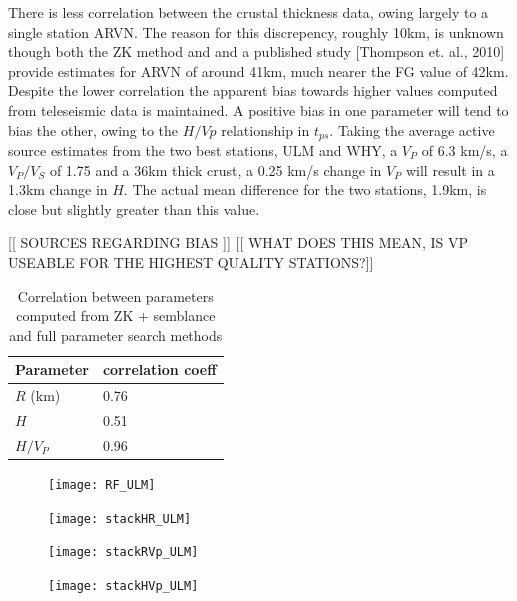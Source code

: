 \documentclass[draft, 12pt]{article}
\begin{document}
There is less correlation between the crustal thickness data, owing largely to a single station ARVN. The reason for this discrepency, roughly 10km, is unknown though both the ZK method and and a published study [Thompson et. al., 2010] provide estimates for ARVN of around 41km, much nearer the FG value of 42km. Despite the lower correlation the apparent bias towards higher values computed from teleseismic data is maintained. A positive bias in one parameter will tend to bias the other, owing to the $H/Vp$ relationship in $t_{ps}$. Taking the average active source estimates from the two best stations, ULM and WHY, a $V_P$ of 6.3 km/s, a $V_P/V_S$ of 1.75 and a 36km thick crust, a 0.25 km/s change in $V_P$ will result in a 1.3km change in $H$. The actual mean difference for the two stations, 1.9km, is close but slightly greater than this value.

[[ SOURCES REGARDING BIAS ]] [[ WHAT DOES THIS MEAN, IS VP USEABLE FOR THE HIGHEST QUALITY STATIONS?]]


\begin{table}
  \begin{tabular}{ l l }
    \hline
    Parameter & correlation coeff \\
    \hline
    $R$ (km) &  0.76 \\
    $H$      &  0.51 \\
    $H/V_P$  &  0.96 \\
    \hline
  \end{tabular}
  \caption{Correlation between parameters computed from ZK + semblance and full parameter search methods}
\label{table:ZKvsFG}

\end{table}


\begin{figure}
  \centering
  \texttt{[image: RF\_ULM]}
  \caption{}
  \label{fig:RF_ULM}
\end{figure}

\begin{figure}
  \centering
  \texttt{[image: stackHR\_ULM]}
  \caption{}
  \label{fig:HR_ULM}
\end{figure}

\begin{figure}
  \centering
  \texttt{[image: stackRVp\_ULM]}
  \caption{}
  \label{fig:RVp_ULM}
\end{figure}

\begin{figure}
  \centering
  \texttt{[image: stackHVp\_ULM]}
  \caption{}
  \label{fig:HVp_ULM}
\end{figure}
\end{document}
